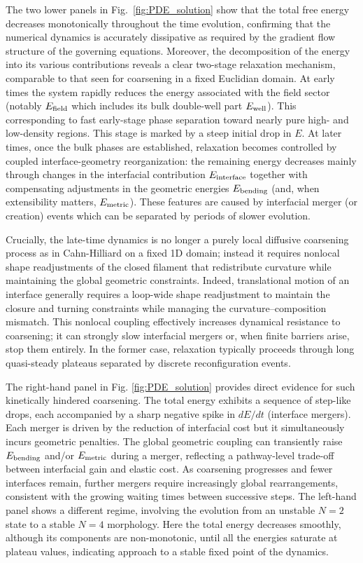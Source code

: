 \documentclass[
aip,
jcp,
reprint, 
floatfix
]{revtex4-1}
\begin{document}
The two lower panels in Fig.~\ref{fig:PDE_solution} show that the total free energy decreases monotonically throughout the time evolution, confirming that the numerical dynamics is accurately dissipative as required by the gradient flow structure of the governing equations. Moreover, the decomposition of the energy into its various contributions reveals a clear two-stage relaxation mechanism, comparable to that seen for coarsening in a fixed Euclidian domain.
At early times the system rapidly reduces the energy associated with the field sector (notably $E_{\rm field}$ which includes its bulk double-well part $E_{\rm well}$). This corresponding to fast early-stage phase separation toward nearly pure high- and low-density regions. This stage is marked by a steep initial drop in $E$. At later times, once the bulk phases are established, relaxation becomes controlled by coupled interface-geometry reorganization: the remaining energy decreases mainly through changes in the interfacial contribution $E_{\rm interface}$ together with compensating adjustments in the geometric energies $E_{\rm bending}$ (and, when extensibility matters, $E_{\rm metric}$). These features are caused by interfacial merger (or creation) events which can be separated by periods of slower evolution. 

Crucially, the late-time dynamics is no longer a purely local diffusive coarsening process as in Cahn-Hilliard on a fixed 1D domain; instead it requires nonlocal shape readjustments of the closed filament that redistribute curvature while maintaining the global geometric constraints.
Indeed, translational motion of an interface generally requires a loop-wide shape readjustment to maintain the closure and turning constraints while managing the curvature--composition mismatch. This nonlocal coupling effectively increases dynamical resistance to coarsening; it can strongly slow interfacial mergers or, when finite barriers arise, stop them entirely. In the former case, relaxation typically proceeds through long quasi-steady plateaus separated by discrete reconfiguration events.

The right-hand panel in Fig. \ref{fig:PDE_solution} provides direct evidence for such kinetically hindered coarsening. The total energy exhibits a sequence of step-like drops, each accompanied by a sharp negative spike in $d E / d t$  (interface mergers). Each merger is driven by the reduction of interfacial cost but it simultaneously incurs geometric penalties. The global geometric coupling can transiently raise $E_{\rm bending}$ and/or $E_{\rm metric}$ during a merger, reflecting a pathway-level trade-off between interfacial gain and elastic cost. As coarsening progresses and fewer interfaces remain, further mergers require increasingly global rearrangements, consistent with the growing waiting times between successive steps. The left-hand panel shows a different regime, involving the evolution from an unstable $N=2$ state to a stable $N=4$ morphology. Here the total energy decreases smoothly, although its components are non-monotonic, until all the energies saturate at plateau values, indicating approach to a stable fixed point of the dynamics.
\end{document}
